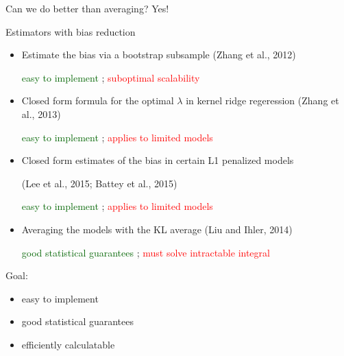\begin{frame}{Can we do better than averaging? Yes!}

Estimators with bias reduction
\begin{itemize}
%

\item
Estimate the bias via a bootstrap subsample (Zhang et al., 2012)

\textcolor{darkgreen}{easy to implement}
; 
\textcolor{red}{suboptimal scalability}

\item
Closed form formula for the optimal $\lambda$ in kernel ridge regeression (Zhang et al., 2013)

\textcolor{darkgreen}{easy to implement}
; 
\textcolor{red}{applies to limited models}

\item
Closed form estimates of the bias in certain L1 penalized models

(Lee et al., 2015; Battey et al., 2015)

\textcolor{darkgreen}{easy to implement}
; 
\textcolor{red}{applies to limited models}

\item
Averaging the models with the KL average (Liu and Ihler, 2014)

\textcolor{darkgreen}{good statistical guarantees}
; 
\textcolor{red}{must solve intractable integral}

\end{itemize}

\pause

Goal: 
\begin{itemize}
    \item easy to implement 
    \item good statistical guarantees 
    \item efficiently calculatable
\end{itemize}

%


%
%
%

\end{frame}


